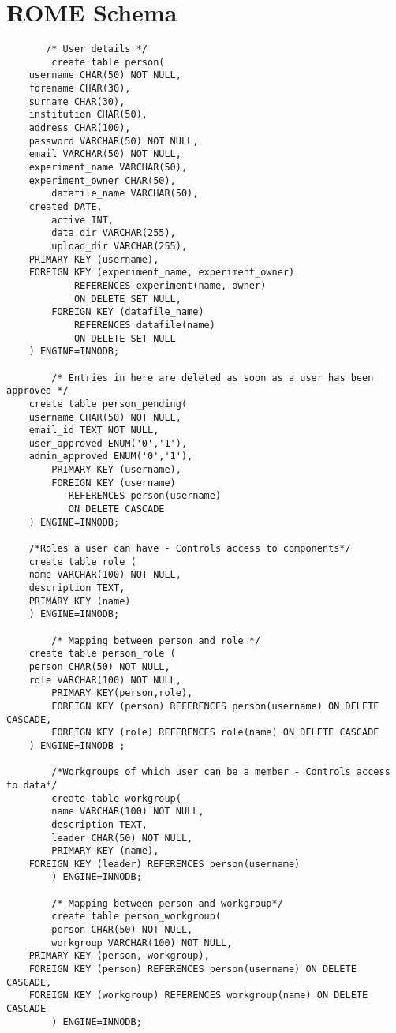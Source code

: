 \chapter{ROME Schema}
\label{sec:rome_schema}


\begin{tiny}
\begin{verbatim}
       /* User details */
        create table person(
 	username CHAR(50) NOT NULL,
 	forename CHAR(30),
 	surname CHAR(30),
 	institution CHAR(50),
 	address CHAR(100),
 	password VARCHAR(50) NOT NULL,
 	email VARCHAR(50) NOT NULL,
  	experiment_name VARCHAR(50),
	experiment_owner CHAR(50),
        datafile_name VARCHAR(50),
 	created DATE,
        active INT,
        data_dir VARCHAR(255),
        upload_dir VARCHAR(255),
	PRIMARY KEY (username),
	FOREIGN KEY (experiment_name, experiment_owner)
            REFERENCES experiment(name, owner)
            ON DELETE SET NULL,
        FOREIGN KEY (datafile_name)
            REFERENCES datafile(name)
            ON DELETE SET NULL
 	) ENGINE=INNODB;

        /* Entries in here are deleted as soon as a user has been approved */ 	
 	create table person_pending(
 	username CHAR(50) NOT NULL,
 	email_id TEXT NOT NULL,
 	user_approved ENUM('0','1'),
 	admin_approved ENUM('0','1'),
        PRIMARY KEY (username),
        FOREIGN KEY (username) 
           REFERENCES person(username)
           ON DELETE CASCADE
 	) ENGINE=INNODB;

  	/*Roles a user can have - Controls access to components*/
 	create table role (
 	name VARCHAR(100) NOT NULL,
 	description TEXT,
	PRIMARY KEY (name)
 	) ENGINE=INNODB; 	

        /* Mapping between person and role */
  	create table person_role (
 	person CHAR(50) NOT NULL,
 	role VARCHAR(100) NOT NULL,
        PRIMARY KEY(person,role),
        FOREIGN KEY (person) REFERENCES person(username) ON DELETE CASCADE,
        FOREIGN KEY (role) REFERENCES role(name) ON DELETE CASCADE
 	) ENGINE=INNODB ;

        /*Workgroups of which user can be a member - Controls access to data*/
        create table workgroup(
        name VARCHAR(100) NOT NULL,
        description TEXT,
        leader CHAR(50) NOT NULL,
        PRIMARY KEY (name),
	FOREIGN KEY (leader) REFERENCES person(username)
        ) ENGINE=INNODB;

        /* Mapping between person and workgroup*/
        create table person_workgroup(
        person CHAR(50) NOT NULL,
        workgroup VARCHAR(100) NOT NULL,
	PRIMARY KEY (person, workgroup),
	FOREIGN KEY (person) REFERENCES person(username) ON DELETE CASCADE,
	FOREIGN KEY (workgroup) REFERENCES workgroup(name) ON DELETE CASCADE
        ) ENGINE=INNODB;


\end{verbatim}
\end{tiny}
